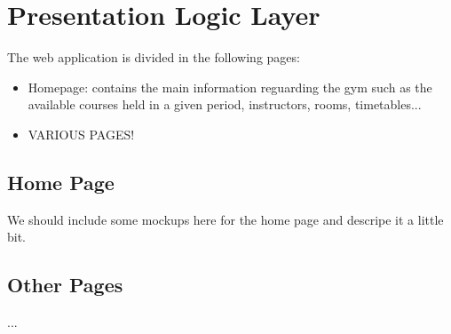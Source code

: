 \section{Presentation Logic Layer}


The web application is divided in the following pages:
\begin{itemize}
	\item Homepage: contains the main information reguarding the gym such as the available courses held in a given period, instructors, rooms, timetables...
	\item VARIOUS PAGES!
\end{itemize}

\subsection{Home Page}

We should include some mockups here for the home page and descripe it a little bit.


\subsection{Other Pages}
...